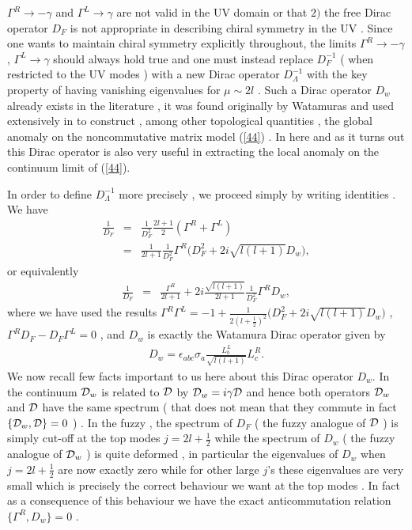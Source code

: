 \documentclass[a4paper,10pt]{article}
\begin{document}
${\Gamma}^R{\longrightarrow}-{\gamma}$ and
${\Gamma}^L{\longrightarrow}{\gamma}$ are not valid in the UV
domain or that $2)$ the free Dirac operator $D_F$ is not
appropriate in describing chiral symmetry in the UV . Since one
wants to maintain chiral symmetry explicitly throughout, the
limits ${\Gamma}^R{\longrightarrow}-{\gamma}$,
${\Gamma}^L{\longrightarrow}{\gamma}$ should always hold true and
one must instead
 replace $D_F^{-1}$ ( when restricted to the UV modes ) with  a new Dirac
operator $D_{\Lambda}^{-1}$ with the key property of having
vanishing eigenvalues for ${\mu}{\sim}2l$ . Such a Dirac operator
$D_{w}$  already exists in the literature , it was found
originally by Watamuras \cite{watamuras} and used extensively in
\cite{trg,bal} to construct , among other topological quantities
, the global anomaly on the noncommutative matrix model (\ref{44})
. In here and as it turns out this Dirac operator is also very
useful in extracting the local anomaly on the continuum limit of
(\ref{44}).

In order to define $D_{\Lambda}^{-1}$ more precisely , we proceed
simply by writing identities . We have
\begin{eqnarray}
\frac{1}{D_F}&=&\frac{1}{D_F^2}\frac{2l+1}{2}({\Gamma}^R+{\Gamma}^L)\nonumber\\
&=&\frac{1}{2l+1}\frac{1}{D_F^2}{\Gamma}^R\bigg(D^2_F+2i\sqrt{l(l+1)}D_{w}\bigg),\nonumber
\end{eqnarray}
or equivalently
\begin{eqnarray}
\frac{1}{D_F}&=&\frac{{\Gamma}^R}{2l+1}+2i\frac{\sqrt{l(l+1)}}{2l+1}\frac{1}{D_F^2}{\Gamma}^RD_{w},\label{result0}
\end{eqnarray}
where we have used the results
${\Gamma}^R{\Gamma}^{L}=-1+\frac{1}{2(l+\frac{1}{2})^2}\big(D^2_F+2i\sqrt{l(l+1)}D_{w}\big)$
, ${\Gamma}^RD_F-D_F{\Gamma}^L=0$ , and $D_{w}$ is exactly the
Watamura Dirac operator given by \cite{watamuras,ydri}
\begin{eqnarray}
D_{w}={\epsilon}_{abc}{\sigma}_a\frac{L_b^L}{\sqrt{l(l+1)}}L_c^R.
\end{eqnarray}
We now recall few facts important to us here about this Dirac
operator $D_{w}$. In the continuum ${\cal D}_{w}$ is related to
${\cal D}$ by ${\cal D}_{w}=i{\gamma}{\cal D}$ and hence both
operators ${\cal D}_{w}$ and ${\cal D}$ have the same spectrum (
that does not mean that they commute in fact $\{{\cal
D}_{w},{\cal D}\}=0$ ) . In the fuzzy , the spectrum of $D_{F}$ (
the fuzzy analogue of ${\cal D}$ ) is simply cut-off at the top
modes $j=2l+\frac{1}{2}$ while the spectrum of $D_{w}$ ( the
fuzzy analogue of ${\cal D}_{w}$ ) is quite deformed , in
particular the eigenvalues of $D_{w}$ when $j=2l+\frac{1}{2}$ are
now exactly zero  while for other large $j$'s these eigenvalues
are very small which is precisely the correct behaviour we want
at the top modes \cite{watamuras,ydri}. In fact as a consequence
of this behaviour we have the exact anticommutation relation
$\{{\Gamma}^R,D_{w}\}=0$ .
\end{document}
